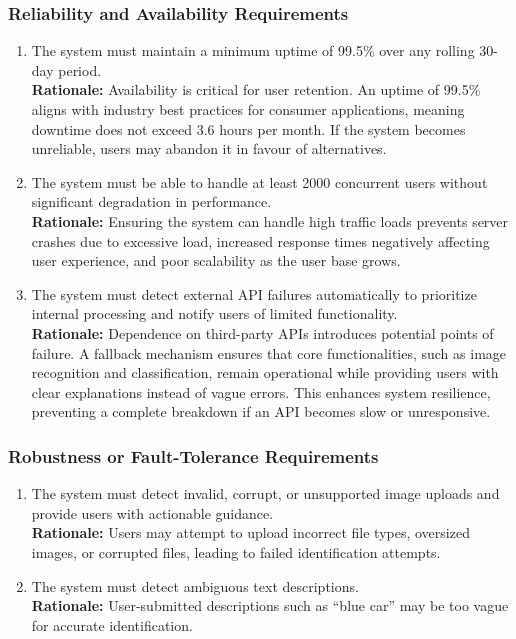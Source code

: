 \documentclass[]{article}
\begin{document}
\subsubsection{Reliability and Availability Requirements}
\label{ssub:reliability_and_availability_requirements}
\begin{enumerate}[label={PR-RA\arabic*.}]
    \item The system must maintain a minimum uptime of 99.5\% over any rolling 30-day period.\\
    \textbf{Rationale:} Availability is critical for user retention. An uptime of 99.5\% aligns with industry best practices for consumer applications, meaning downtime does not exceed 3.6 hours per month. If the system becomes unreliable, users may abandon it in favour of alternatives.
	\item The system must be able to handle at least 2000 concurrent users without significant degradation in performance.\\
	\textbf{Rationale:} Ensuring the system can handle high traffic loads prevents server crashes due to excessive load, increased response times negatively affecting user experience, and poor scalability as the user base grows.
	\item The system must detect external API failures automatically to prioritize internal processing and notify users of limited functionality.\\
	\textbf{Rationale:} Dependence on third-party APIs introduces potential points of failure. A fallback mechanism ensures that core functionalities, such as image recognition and classification, remain operational while providing users with clear explanations instead of vague errors. This enhances system resilience, preventing a complete breakdown if an API becomes slow or unresponsive.

\end{enumerate}

\subsubsection{Robustness or Fault-Tolerance Requirements}
\label{ssub:robustness_or_fault_tolerance_requirements}
\begin{enumerate}[label={PR-RFT\arabic*.}]
    \item The system must detect invalid, corrupt, or unsupported image uploads and provide users with actionable guidance.\\
	\textbf{Rationale:} Users may attempt to upload incorrect file types, oversized images, or corrupted files, leading to failed identification attempts.
	\item The system must detect ambiguous text descriptions.\\
	\textbf{Rationale:} User-submitted descriptions such as “blue car” may be too vague for accurate identification.
\end{enumerate}
\end{document}
